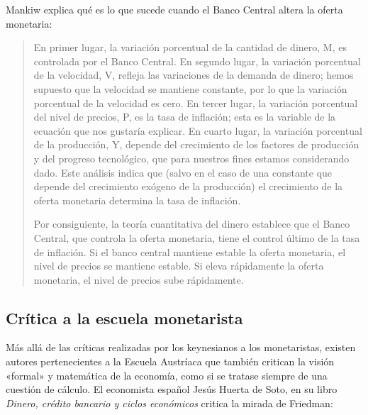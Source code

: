 \documentclass[12pt,a4paper,twoside]{book}
\begin{document}
Mankiw explica qué es lo que sucede cuando el Banco Central altera la oferta monetaria:

\begin{quotation}
En primer lugar, la variación porcentual de la cantidad de dinero, M, es controlada por el Banco Central. En segundo lugar, la variación porcentual de la velocidad, V, refleja las variaciones de la demanda de dinero; hemos supuesto que la velocidad se mantiene constante, por lo que la variación porcentual de la velocidad es cero. En tercer lugar, la variación porcentual del nivel de precios, P, es la tasa de inflación; esta es la variable de la ecuación que nos gustaría explicar. En cuarto lugar, la variación porcentual de la producción, Y, depende del crecimiento de los factores de producción y del progreso tecnológico, que para nuestros fines estamos considerando dado. Este análisis indica que (salvo en el caso de una constante que depende del crecimiento exógeno de la producción) el crecimiento de la oferta monetaria determina la tasa de inflación.

Por consiguiente, la teoría cuantitativa del dinero establece que el Banco Central, que controla la oferta monetaria, tiene el control último de la tasa de inflación. Si el banco central mantiene estable la oferta monetaria, el nivel de precios se mantiene estable. Si eleva rápidamente la oferta monetaria, el nivel de precios sube rápidamente. \cite[págs. 179-180]{mankiw}
\end{quotation}

\subsection{Crítica a la escuela monetarista}
Más allá de las críticas realizadas por los keynesianos a los monetaristas, existen autores pertenecientes a la Escuela Austríaca que también critican la visión «formal» y matemática de la economía, como si se tratase siempre de una cuestión de cálculo. El economista español Jesús Huerta de Soto, en su libro \textit{Dinero, crédito bancario y ciclos económicos} critica la mirada de Friedman:
\end{document}
